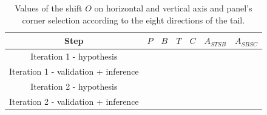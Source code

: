  \begin{table}[ht]
    \normalsize

    \centering
    \caption{Values of the shift $O$ on horizontal and vertical axis and panel's corner selection according to the eight directions of the tail.}
    \setlength{\tabcolsep}{.45em}
    \begin{tabular}{|c|c|c|c|c|c|c|}

          \hline
        Step & $P$ & $B$ & $T$ & $C$ & $A_{STSB}$ & $A_{SBSC}$    \\
        \hline
        
        Iteration 1 - hypothesis & \modif{??}   & \modif{??}  & \modif{??} & \modif{??}  & \modif{??} & \modif{??}  \\
        \hline
        Iteration 1 - validation + inference & \modif{??}   & \modif{??}  & \modif{??} & \modif{??}  & \modif{??} & \modif{??}  \\
        \hline
        Iteration 2 - hypothesis & \modif{??}   & \modif{??}  & \modif{??} & \modif{??}  & \modif{??} & \modif{??}  \\
        \hline
        Iteration 2 - validation + inference & \modif{??}   & \modif{??}  & \modif{??} & \modif{??}  & \modif{??} & \modif{??}  \\
        \hline
        \end{tabular}
    \label{tab:ex:framework_evaluation_details}
  \end{table}%



